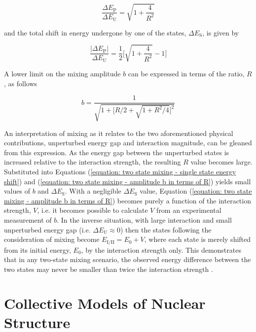 \begin{equation}
\frac{\Delta E_\mathrm{P}}{\Delta E_\mathrm{U}} = \sqrt{1+\frac{4}{R^2}}
\label{equation: two state mixing energy gaps and strength}
\end{equation}

and the total shift in energy undergone by one of the states, $\Delta E_\mathrm{S}$, is given by

\begin{equation}
\frac{\lvert \Delta E_\mathrm{P} \rvert}{\Delta E_\mathrm{U}} = \frac{1}{2}\Bigg[\sqrt{1+\frac{4}{R^2}}-1\Bigg]
\label{equation: two state mixing - single state energy shift}
\end{equation}

A lower limit on the mixing amplitude $b$ can be expressed in terms of the ratio, $R$, as follows

\begin{equation}
b = \frac{1}{\sqrt{1+\Big[R/2+\sqrt{1+R^2/4}\Big]^2}}
\label{equation: two state mixing - amplitude b in terms of R}
\end{equation}

An interpretation of mixing as it relates to the two aforementioned physical contributions, unperturbed energy gap and interaction magnitude, can be gleaned from this expression. As the energy gap between the unperturbed states is increased relative to the interaction strength, the resulting $R$ value becomes large. Substituted into Equations (\ref{equation: two state mixing - single state energy shift}) and (\ref{equation: two state mixing - amplitude b in terms of R}) yields small values of $b$ and $\Delta E_\mathrm{S}$. With a negligible $\Delta E_\mathrm{S}$ value, Equation (\ref{equation: two state mixing - amplitude b in terms of R}) becomes purely a function of the interaction strength, $V$, i.e. it becomes possible to calculate $V$ from an experimental measurement of $b$. In the inverse situation, with large interaction and small unperturbed energy gap (i.e. $\Delta E_\mathrm{U} \approx 0$) then the states following the consideration of mixing become $E_\mathrm{I/II} = E_0 + V$, where each state is merely shifted from its initial energy, $E_0$, by the interaction strength only. This demonstrates that in any two-state mixing scenario, the observed energy difference between the two states may never be smaller than twice the interaction strength \cite{CastenText}. 

\section{Collective Models of Nuclear Structure}

